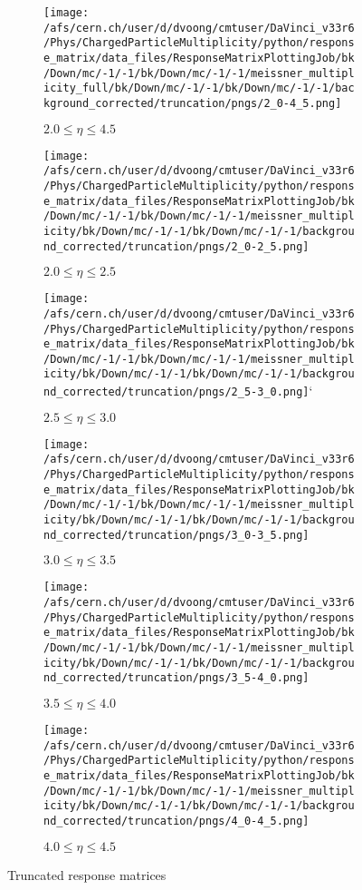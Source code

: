 \begin{figure}
	\centering
	\begin{subfigure}{0.32\textwidth}
		\texttt{[image: /afs/cern.ch/user/d/dvoong/cmtuser/DaVinci\_v33r6/Phys/ChargedParticleMultiplicity/python/response\_matrix/data\_files/ResponseMatrixPlottingJob/bk/Down/mc/-1/-1/bk/Down/mc/-1/-1/meissner\_multiplicity\_full/bk/Down/mc/-1/-1/bk/Down/mc/-1/-1/background\_corrected/truncation/pngs/2\_0-4\_5.png]}
		\caption{$2.0 \le \eta \le 4.5$}
	\end{subfigure}
	\begin{subfigure}{0.32\textwidth}
		\texttt{[image: /afs/cern.ch/user/d/dvoong/cmtuser/DaVinci\_v33r6/Phys/ChargedParticleMultiplicity/python/response\_matrix/data\_files/ResponseMatrixPlottingJob/bk/Down/mc/-1/-1/bk/Down/mc/-1/-1/meissner\_multiplicity/bk/Down/mc/-1/-1/bk/Down/mc/-1/-1/background\_corrected/truncation/pngs/2\_0-2\_5.png]}
		\caption{$2.0 \le \eta \le 2.5$}
	\end{subfigure}
	\begin{subfigure}{0.32\textwidth}
		\texttt{[image: /afs/cern.ch/user/d/dvoong/cmtuser/DaVinci\_v33r6/Phys/ChargedParticleMultiplicity/python/response\_matrix/data\_files/ResponseMatrixPlottingJob/bk/Down/mc/-1/-1/bk/Down/mc/-1/-1/meissner\_multiplicity/bk/Down/mc/-1/-1/bk/Down/mc/-1/-1/background\_corrected/truncation/pngs/2\_5-3\_0.png]}`
		\caption{$2.5 \le \eta \le 3.0$}
	\end{subfigure}
	\begin{subfigure}{0.32\textwidth}
		\texttt{[image: /afs/cern.ch/user/d/dvoong/cmtuser/DaVinci\_v33r6/Phys/ChargedParticleMultiplicity/python/response\_matrix/data\_files/ResponseMatrixPlottingJob/bk/Down/mc/-1/-1/bk/Down/mc/-1/-1/meissner\_multiplicity/bk/Down/mc/-1/-1/bk/Down/mc/-1/-1/background\_corrected/truncation/pngs/3\_0-3\_5.png]}
		\caption{$3.0 \le \eta \le 3.5$}
	\end{subfigure}
	\begin{subfigure}{0.32\textwidth}
		\texttt{[image: /afs/cern.ch/user/d/dvoong/cmtuser/DaVinci\_v33r6/Phys/ChargedParticleMultiplicity/python/response\_matrix/data\_files/ResponseMatrixPlottingJob/bk/Down/mc/-1/-1/bk/Down/mc/-1/-1/meissner\_multiplicity/bk/Down/mc/-1/-1/bk/Down/mc/-1/-1/background\_corrected/truncation/pngs/3\_5-4\_0.png]}
		\caption{$3.5 \le \eta \le 4.0$}
	\end{subfigure}
	\begin{subfigure}{0.32\textwidth}
		\texttt{[image: /afs/cern.ch/user/d/dvoong/cmtuser/DaVinci\_v33r6/Phys/ChargedParticleMultiplicity/python/response\_matrix/data\_files/ResponseMatrixPlottingJob/bk/Down/mc/-1/-1/bk/Down/mc/-1/-1/meissner\_multiplicity/bk/Down/mc/-1/-1/bk/Down/mc/-1/-1/background\_corrected/truncation/pngs/4\_0-4\_5.png]}
		\caption{$4.0 \le \eta \le 4.5$}
	\end{subfigure}
	\caption{Truncated response matrices}
	\label{fig: truncated response matrices}
\end{figure}